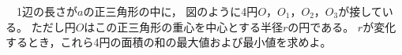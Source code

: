 \begin{problem}
　1辺の長さが$a$の正三角形の中に，
図のように4円$O$，$O_1$，$O_2$，$O_3$が接している。
ただし円$O$はこの正三角形の重心を中心とする半径$r$の円である。
$r$が変化するとき，これら4円の面積の和の最大値および最小値を求めよ。
\end{problem}
